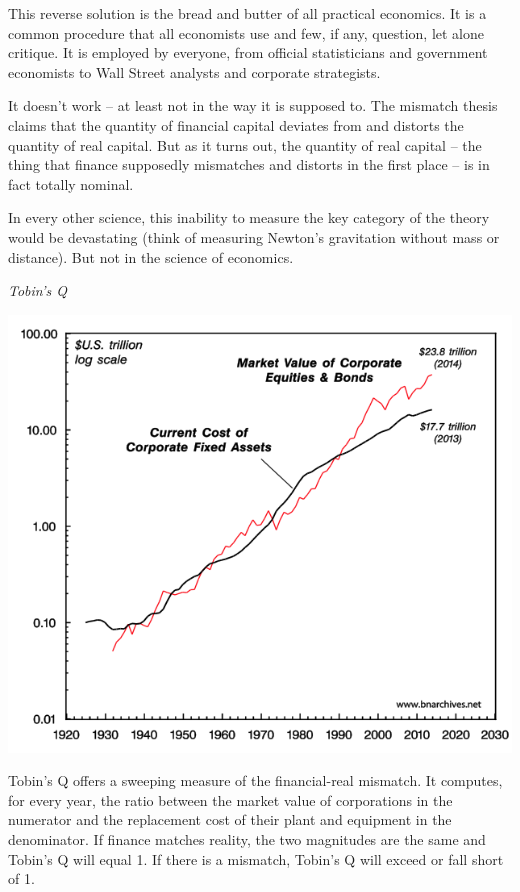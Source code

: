 \documentclass[
]{book}
\begin{document}
This reverse solution is the bread and butter of all practical economics. It is a common procedure that all economists use and few, if any, question, let alone critique. It is employed by everyone, from official statisticians and government economists to Wall Street analysts and corporate strategists.

It doesn't work -- at least not in the way it is supposed to.
The mismatch thesis claims that the quantity of financial capital deviates from and distorts the quantity of real capital. But as it turns out, the quantity of real capital -- the thing that finance supposedly mismatches and distorts in the first place -- is in fact totally nominal.

In every other science, this inability to measure the key category of the theory would be devastating (think of measuring Newton's gravitation without mass or distance). But not in the science of economics.

\emph{Tobin's Q}

\includegraphics{fig/Quantity_of_US_Capital.png}

Tobin's Q offers a sweeping measure of the financial-real mismatch. It computes, for every year, the ratio between the market value of corporations in the numerator and the replacement cost of their plant and equipment in the denominator. If finance matches reality, the two magnitudes are the same and Tobin's Q will equal 1. If there is a mismatch, Tobin's Q will exceed or fall short of 1.
\end{document}
